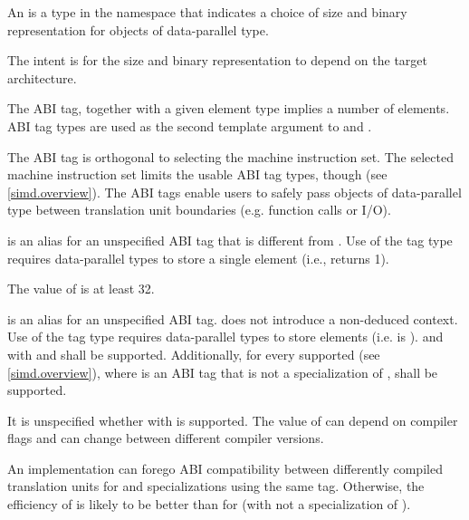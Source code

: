 \begin{wgText}
\pnum
An  is a type in the  namespace that indicates a choice of size and binary representation for objects of data-parallel type. \begin{note}The intent is for the size and binary representation to depend on the target architecture.\end{note} The ABI tag, together with a given element type implies a number of elements. ABI tag types are used as the second template argument to  and .

\pnum
\begin{note}The ABI tag is orthogonal to selecting the machine instruction set. The selected machine instruction set limits the usable ABI tag types, though (see \ref{simd.overview}). The ABI tags enable users to safely pass objects of data-parallel type between translation unit boundaries (e.g. function calls or I/O).\end{note}

\pnum
{} is an alias for an unspecified ABI tag that is different from .
Use of the  tag type requires data-parallel types to store a single element (i.e.,  returns 1).

\pnum
The value of  is at least 32.

\pnum
{} is an alias for an unspecified ABI tag.
 does not introduce a non-deduced context.
Use of the  tag type requires data-parallel types to store  elements (i.e.  is ).  and  with  and  shall be supported. Additionally, for every supported  (see \ref{simd.overview}), where  is an ABI tag that is not a specialization of ,  shall be supported.

\pnum
\begin{note}It is unspecified whether  with  is supported. The value of  can depend on compiler flags and can change between different compiler versions.\end{note}

\pnum
\begin{note}An implementation can forego ABI compatibility between differently compiled translation units for  and  specializations using the same  tag. Otherwise, the efficiency of  is likely to be better than for  (with  not a specialization of ).\end{note}


\end{wgText}
